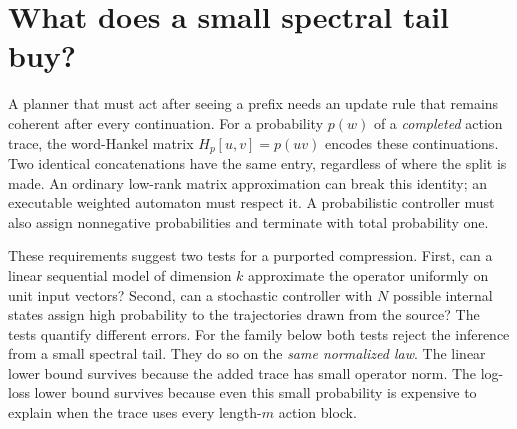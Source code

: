 \begin{abstract}
A small singular-value tail is often taken as evidence that a sequential predictor can be replaced by a small controller. We construct a single probability law on completed binary traces for which two natural readings of that inference fail. For every fixed rank budget, its Hankel operator approaches the rank-one operators in spectral norm, yet the best word-Hankel approximation at that budget has error bounded away from zero. On the same law, vanishing excess log-loss requires a proper probabilistic controller with \(L^{1-o(1)}\) states, where \(L\) is the length of one rare trace. For budgets $N=L^{\rho+o(1)}$ with $0<\rho\le1$, we determine the exact asymptotic log-loss, $M(1-\rho)\log 2$, where the exceptional trace has probability $M/L$. The proof combines a geometric waiting process and a block-enumerating trace. We also derive a test that turns one teacher-forced sequence probability into a lower bound against an entire controller class. On eight binary gate-planning instances, the test yields a \(0.7046\)-nat lower bound against one-state controllers for one constrained Qwen2.5 policy. The remaining instances delimit the power of the test.
\end{abstract}

\section{What does a small spectral tail buy?}
A planner that must act after seeing a prefix needs an update rule that remains coherent after every continuation. For a probability \(p(w)\) of a \emph{completed} action trace, the word-Hankel matrix \(H_p[u,v]=p(uv)\) encodes these continuations. Two identical concatenations have the same entry, regardless of where the split is made. An ordinary low-rank matrix approximation can break this identity; an executable weighted automaton must respect it. A probabilistic controller must also assign nonnegative probabilities and terminate with total probability one.

These requirements suggest two tests for a purported compression. First, can a linear sequential model of dimension \(k\) approximate the operator uniformly on unit input vectors? Second, can a stochastic controller with \(N\) possible internal states assign high probability to the trajectories drawn from the source? The tests quantify different errors. For the family below both tests reject the inference from a small spectral tail. They do so on the \emph{same normalized law}. The linear lower bound survives because the added trace has small operator norm. The log-loss lower bound survives because even this small probability is expensive to explain when the trace uses every length-\(m\) action block.

